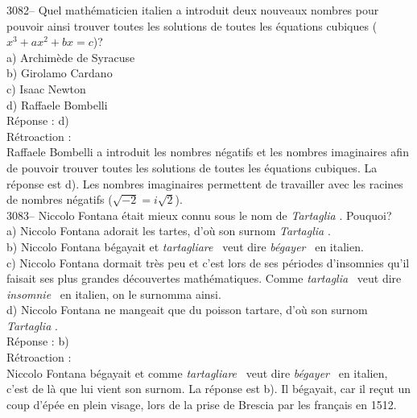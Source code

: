 \documentclass[letterpaper, 12pt]{article}
\begin{document}
3082-- Quel math\'ematicien italien a introduit deux nouveaux nombres pour pouvoir ainsi trouver toutes les solutions de toutes les \'equations cubiques ($x{^3} + ax^{2} + bx = c$)?\\

a) Archim\`ede de Syracuse\\
b) Girolamo Cardano\\
c) Isaac Newton\\
d) Raffaele Bombelli\\

R\'eponse : d)\\

R\'etroaction :\\
Raffaele Bombelli a introduit les nombres n\'egatifs et les nombres imaginaires afin de pouvoir trouver toutes les solutions de toutes les \'equations cubiques. La r\'eponse est d). Les nombres imaginaires permettent de travailler avec les racines de nombres n\'egatifs ($\sqrt{-2} = i\sqrt{2}$).\\



3083-- Niccolo Fontana \'etait mieux connu sous le nom de \og \emph{Tartaglia} \fg. Pouquoi?\\

a) Niccolo Fontana adorait les tartes, d'o\`u son surnom \og \emph{Tartaglia} \fg.\\
b) Niccolo Fontana b\'egayait et \og \emph{tartagliare} \fg \ veut dire \og \emph{b\'egayer} \fg \ en italien.\\
c) Niccolo Fontana dormait tr\`es peu et c'est lors de ses p\'eriodes d'insomnies qu'il faisait ses plus grandes d\'ecouvertes math\'ematiques. Comme \og \emph{tartaglia} \fg \ veut dire \og \emph{insomnie} \fg \ en italien, on le surnomma ainsi.\\
d) Niccolo Fontana ne mangeait que du poisson tartare, d'o\`u son surnom \og \emph{Tartaglia} \fg.\\

R\'eponse : b)\\

R\'etroaction :\\
Niccolo Fontana b\'egayait et comme \og \emph{tartagliare} \fg \ veut dire \og \emph{b\'egayer} \fg \ en italien, c'est de l\`a que lui vient son surnom. La r\'eponse est b). Il b\'egayait, car il re\c cut un coup d'\'ep\'ee en plein visage, lors de la prise de Brescia par les fran\c cais en 1512.\\
\end{document}

